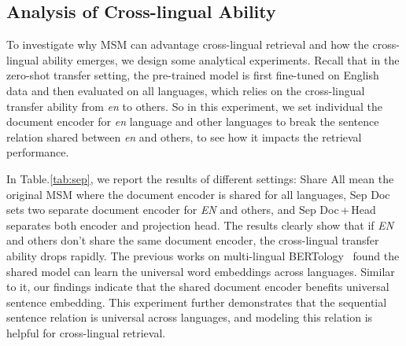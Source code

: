 \subsection{Analysis of Cross-lingual Ability}
\label{sec:analysis}

To investigate why MSM can advantage cross-lingual retrieval and how the cross-lingual ability emerges, we design some analytical experiments. Recall that in the zero-shot transfer setting, the pre-trained model is first fine-tuned on English data and then evaluated on all languages, which relies on the cross-lingual transfer ability from \textit{en} to others.
So in this experiment, we set individual the document encoder for \textit{en} language and other languages to break the sentence relation shared between \textit{en} and others, to see how it impacts the retrieval performance. 

In Table.\ref{tab:sep}, we report the results of different settings: Share All mean the original MSM where the document encoder is shared for all languages, Sep Doc sets two separate document encoder for \textit{EN} and others, and Sep Doc\,+\,Head separates both encoder and projection head. 
The results clearly show that if \textit{EN} and others don't share the same document encoder, the cross-lingual transfer ability drops rapidly. 
The previous works on multi-lingual BERTology~\citep{conneau-etal-2020-emerging, artetxe-etal-2020-cross, rogers2020primer} found the shared model can learn the universal word embeddings across languages. Similar to it, our findings indicate that the shared document encoder benefits universal sentence embedding. This experiment further demonstrates that the sequential sentence relation is universal across languages, and modeling this relation is helpful for cross-lingual retrieval.






